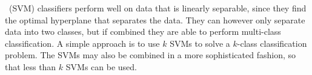 \svm\ (SVM) classifiers perform well on data that is linearly separable, since they find the optimal hyperplane that separates the data. They can however only separate data into two classes, but if combined they are able to perform multi-class classification. A simple approach is to use $k$ SVMs to solve a $k$-class classification problem. The SVMs may also be combined in a more sophisticated fashion, so that less than $k$ SVMs can be used. \cite{Mayoras99SVM}